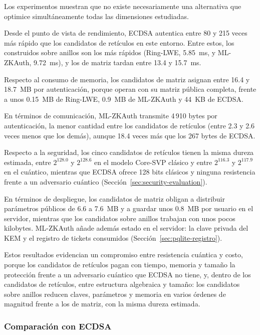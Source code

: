 Los experimentos muestran que no existe necesariamente una alternativa que optimice
simultáneamente todas las dimensiones estudiadas.

Desde el punto de vista de rendimiento,
ECDSA autentica entre 80 y 215 veces más rápido que los candidatos de retículos en este entorno. Entre estos, los construidos sobre anillos son los más rápidos (Ring-LWE, 5.85~ms, y ML-ZKAuth, 9.72~ms), y los de matriz tardan entre 13.4 y 15.7~ms.

Respecto al consumo de memoria,
los candidatos de matriz asignan entre 16.4 y 18.7~MB por autenticación, porque operan con su matriz pública completa, frente a unos 0.15~MB de Ring-LWE, 0.9~MB de ML-ZKAuth y 44~KB de ECDSA.

En términos de comunicación,
ML-ZKAuth transmite 4\,910 bytes por autenticación, la menor cantidad entre los candidatos de retículos (entre 2.3 y 2.6 veces menos que los demás), aunque 18.4 veces más que los 267 bytes de ECDSA.

Respecto a la seguridad,
los cinco candidatos de retículos tienen la misma dureza estimada, entre $2^{128.0}$ y $2^{128.6}$ en el modelo Core-SVP clásico y entre $2^{116.3}$ y $2^{117.9}$ en el cuántico, mientras que ECDSA ofrece 128 bits clásicos y ninguna resistencia frente a un adversario cuántico (Sección~\ref{sec:security-evaluation}).

En términos de despliegue,
los candidatos de matriz obligan a distribuir parámetros públicos de 6.6 a 7.6~MB y a guardar unos 0.8~MB por usuario en el servidor, mientras que los candidatos sobre anillos trabajan con unos pocos kilobytes. ML-ZKAuth añade además estado en el servidor: la clave privada del KEM y el registro de tickets consumidos (Sección~\ref{sec:pqlite-registro}).

Estos resultados evidencian un compromiso entre
resistencia cuántica y costo, porque los candidatos de retículos pagan con tiempo, memoria y tamaño la protección frente a un adversario cuántico que ECDSA no tiene, y, dentro de los candidatos de retículos, entre estructura algebraica y tamaño: los candidatos sobre anillos reducen claves, parámetros y memoria en varios órdenes de magnitud frente a los de matriz, con la misma dureza estimada.


\subsubsection{Comparación con ECDSA}
\label{subsec:comparison-ecdsa}

